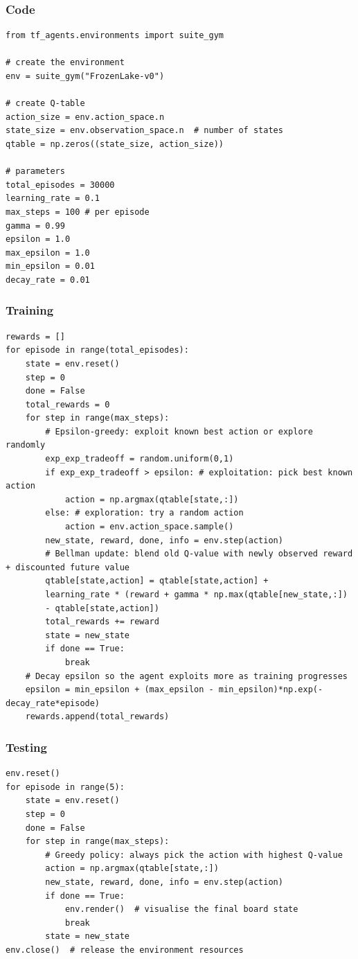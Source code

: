 \begin{frame}[fragile]\frametitle{Code}

\begin{lstlisting}
from tf_agents.environments import suite_gym

# create the environment
env = suite_gym("FrozenLake-v0")

# create Q-table
action_size = env.action_space.n
state_size = env.observation_space.n  # number of states
qtable = np.zeros((state_size, action_size))

# parameters
total_episodes = 30000
learning_rate = 0.1
max_steps = 100 # per episode
gamma = 0.99
epsilon = 1.0
max_epsilon = 1.0
min_epsilon = 0.01
decay_rate = 0.01

\end{lstlisting}

\end{frame}


\begin{frame}[fragile]\frametitle{Training}

\begin{lstlisting}
rewards = []
for episode in range(total_episodes):
	state = env.reset()
	step = 0
	done = False
	total_rewards = 0
	for step in range(max_steps):
		# Epsilon-greedy: exploit known best action or explore randomly
		exp_exp_tradeoff = random.uniform(0,1)
		if exp_exp_tradeoff > epsilon: # exploitation: pick best known action
			action = np.argmax(qtable[state,:])
		else: # exploration: try a random action
			action = env.action_space.sample()
		new_state, reward, done, info = env.step(action)
		# Bellman update: blend old Q-value with newly observed reward + discounted future value
		qtable[state,action] = qtable[state,action] +
		learning_rate * (reward + gamma * np.max(qtable[new_state,:])
		- qtable[state,action])
		total_rewards += reward
		state = new_state
		if done == True:
			break
	# Decay epsilon so the agent exploits more as training progresses
	epsilon = min_epsilon + (max_epsilon - min_epsilon)*np.exp(-decay_rate*episode)
	rewards.append(total_rewards)

\end{lstlisting}

\end{frame}

\begin{frame}[fragile]\frametitle{Testing}

\begin{lstlisting}
env.reset()
for episode in range(5):
	state = env.reset()
	step = 0
	done = False
	for step in range(max_steps):
		# Greedy policy: always pick the action with highest Q-value
		action = np.argmax(qtable[state,:])
		new_state, reward, done, info = env.step(action)
		if done == True:
			env.render()  # visualise the final board state
			break
		state = new_state
env.close()  # release the environment resources
\end{lstlisting}

\end{frame}

